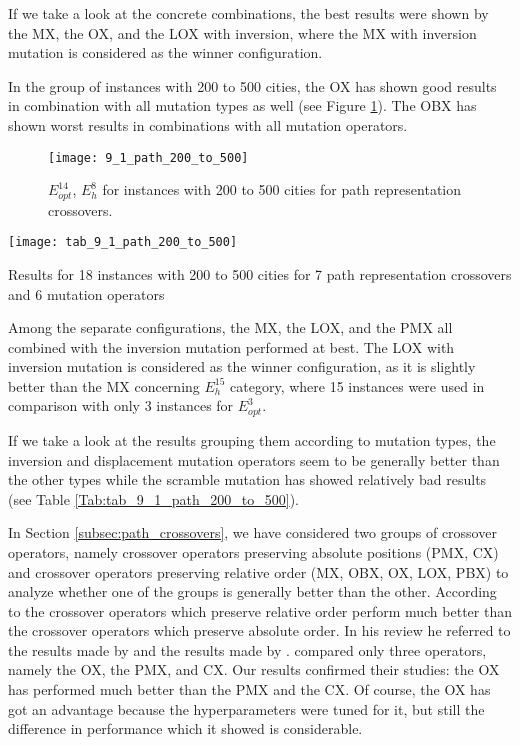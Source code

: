 If we take a look at the concrete combinations, the best results were shown by the MX, the OX, and the LOX with inversion, where the MX with inversion mutation is considered as the winner configuration.\par 

In the group of instances with 200 to 500 cities, the OX has shown good results in combination with all mutation types as well (see Figure \ref{fig:9_1_path_200_to_500}). The OBX has shown worst results in combinations with all mutation operators.\par

\begin{figure}[htp] \centering
	\centering
	\texttt{[image: 9\_1\_path\_200\_to\_500]}
	\caption{$E_{opt}^{14}$, $E_{h}^{8}$ for instances with 200 to 500 cities for path representation crossovers.}
	\label{fig:9_1_path_200_to_500}
\end{figure}

\begin{table}[htp] \centering
	\centering
	\texttt{[image: tab\_9\_1\_path\_200\_to\_500]}
	\caption{Results for 18 instances with 200 to 500 cities for 7 path representation crossovers and 6 mutation operators}
	\label{Tab:tab_9_1_path_200_to_500}
\end{table}

Among the separate configurations, the MX, the LOX, and the PMX all combined with the inversion mutation performed at best. The LOX with inversion mutation is considered as the winner configuration, as it is slightly better than the MX concerning $E^{15}_{h}$ category, where 15 instances were used in comparison with only 3 instances for $E^{3}_{opt}$. \par 

If we take a look at the results grouping them according to mutation types, the inversion and displacement mutation operators seem to be generally better than the other types while the scramble mutation has showed relatively bad results (see Table \ref{Tab:tab_9_1_path_200_to_500}). \par 

In Section \ref{subsec:path_crossovers}, we have considered two groups of crossover operators, namely crossover operators preserving absolute positions (PMX, CX) and crossover operators preserving relative order (MX, OBX, OX, LOX, PBX) to analyze whether one of the groups is generally better than the other. According to \citeauthor{potvin1996genetic} \cite{potvin1996genetic} the crossover operators which preserve relative order perform much better than the crossover operators which preserve absolute order. In his review he referred to the results made by \citeauthor{oliver1987study} \cite{oliver1987study} and the results made by \citeauthor{starkweather1991comparison} \cite{starkweather1991comparison}. \citeauthor{oliver1987study} compared only three operators, namely the OX, the PMX, and CX. Our results confirmed their studies: the OX has performed much better than the PMX and the CX. Of course, the OX has got an advantage because the hyperparameters were tuned for it, but still the difference in performance which it showed is considerable. \par
 
